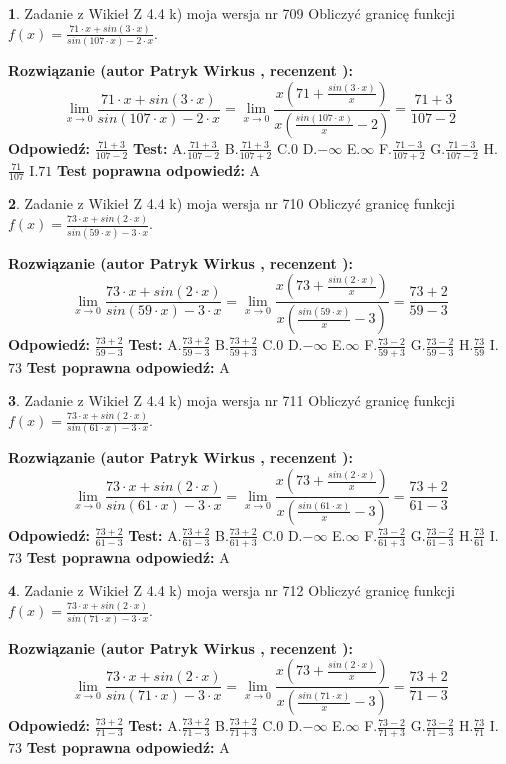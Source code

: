 \documentclass[12pt, a4paper]{article}
\theoremstyle{definition} %
\newtheorem{zad}{}
\newcommand{\zadStart}[1]{\begin{zad}#1\newline}
\newcommand{\zadStop}{\end{zad}}
\newcommand{\rozwStart}[2]{\noindent \textbf{Rozwiązanie (autor #1 , recenzent #2): }\newline}
\newcommand{\rozwStop}{\newline}
\newcommand{\odpStart}{\noindent \textbf{Odpowiedź:}\newline}
\newcommand{\odpStop}{\newline}
\newcommand{\testStart}{\noindent \textbf{Test:}\newline}
\newcommand{\testStop}{\newline}
\newcommand{\kluczStart}{\noindent \textbf{Test poprawna odpowiedź:}\newline}
\newcommand{\kluczStop}{\newline}
\begin{document}
\zadStart{Zadanie z Wikieł Z 4.4 k) moja wersja nr 709}
Obliczyć granicę funkcji $f(x)=\frac{71\cdot x +sin(3\cdot x)}{sin(107\cdot x) -2\cdot x}$.
\zadStop
\rozwStart{Patryk Wirkus}{}
$$\lim\limits_{x\to 0}\frac{71\cdot x +sin(3\cdot x)}{sin(107\cdot x) -2\cdot x}
=\lim\limits_{x\to 0}\frac{x(71+\frac{sin(3\cdot x)}{x})}{x(\frac{sin(107\cdot x)}{x}-2)}
=\frac{71+3}{107-2}$$
\rozwStop
\odpStart
$\frac{71+3}{107-2}$
\odpStop
\testStart
A.$\frac{71+3}{107-2}$
B.$\frac{71+3}{107+2}$
C.$0$
D.$-\infty$
E.$\infty$
F.$\frac{71-3}{107+2}$
G.$\frac{71-3}{107-2}$
H.$\frac{71}{107}$
I.$71$
\testStop
\kluczStart
A
\kluczStop



\zadStart{Zadanie z Wikieł Z 4.4 k) moja wersja nr 710}
Obliczyć granicę funkcji $f(x)=\frac{73\cdot x +sin(2\cdot x)}{sin(59\cdot x) -3\cdot x}$.
\zadStop
\rozwStart{Patryk Wirkus}{}
$$\lim\limits_{x\to 0}\frac{73\cdot x +sin(2\cdot x)}{sin(59\cdot x) -3\cdot x}
=\lim\limits_{x\to 0}\frac{x(73+\frac{sin(2\cdot x)}{x})}{x(\frac{sin(59\cdot x)}{x}-3)}
=\frac{73+2}{59-3}$$
\rozwStop
\odpStart
$\frac{73+2}{59-3}$
\odpStop
\testStart
A.$\frac{73+2}{59-3}$
B.$\frac{73+2}{59+3}$
C.$0$
D.$-\infty$
E.$\infty$
F.$\frac{73-2}{59+3}$
G.$\frac{73-2}{59-3}$
H.$\frac{73}{59}$
I.$73$
\testStop
\kluczStart
A
\kluczStop



\zadStart{Zadanie z Wikieł Z 4.4 k) moja wersja nr 711}
Obliczyć granicę funkcji $f(x)=\frac{73\cdot x +sin(2\cdot x)}{sin(61\cdot x) -3\cdot x}$.
\zadStop
\rozwStart{Patryk Wirkus}{}
$$\lim\limits_{x\to 0}\frac{73\cdot x +sin(2\cdot x)}{sin(61\cdot x) -3\cdot x}
=\lim\limits_{x\to 0}\frac{x(73+\frac{sin(2\cdot x)}{x})}{x(\frac{sin(61\cdot x)}{x}-3)}
=\frac{73+2}{61-3}$$
\rozwStop
\odpStart
$\frac{73+2}{61-3}$
\odpStop
\testStart
A.$\frac{73+2}{61-3}$
B.$\frac{73+2}{61+3}$
C.$0$
D.$-\infty$
E.$\infty$
F.$\frac{73-2}{61+3}$
G.$\frac{73-2}{61-3}$
H.$\frac{73}{61}$
I.$73$
\testStop
\kluczStart
A
\kluczStop



\zadStart{Zadanie z Wikieł Z 4.4 k) moja wersja nr 712}
Obliczyć granicę funkcji $f(x)=\frac{73\cdot x +sin(2\cdot x)}{sin(71\cdot x) -3\cdot x}$.
\zadStop
\rozwStart{Patryk Wirkus}{}
$$\lim\limits_{x\to 0}\frac{73\cdot x +sin(2\cdot x)}{sin(71\cdot x) -3\cdot x}
=\lim\limits_{x\to 0}\frac{x(73+\frac{sin(2\cdot x)}{x})}{x(\frac{sin(71\cdot x)}{x}-3)}
=\frac{73+2}{71-3}$$
\rozwStop
\odpStart
$\frac{73+2}{71-3}$
\odpStop
\testStart
A.$\frac{73+2}{71-3}$
B.$\frac{73+2}{71+3}$
C.$0$
D.$-\infty$
E.$\infty$
F.$\frac{73-2}{71+3}$
G.$\frac{73-2}{71-3}$
H.$\frac{73}{71}$
I.$73$
\testStop
\kluczStart
A
\kluczStop
\end{document}

